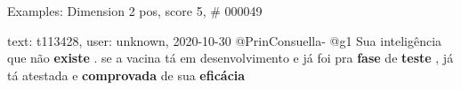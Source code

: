 \begin{frame}{Examples: Dimension 2 pos, score 5, \# 000049}
\footnotesize
\begin{exampleblock}{text: t113428, user: unknown, 2020-10-30}
@PrinConsuella- @g1 Sua inteligência que não \textbf{existe} . se a vacina tá 
em desenvolvimento e já foi pra \textbf{fase} de \textbf{teste} , já tá 
atestada e \textbf{comprovada} de sua \textbf{eficácia} 
\end{exampleblock}
\end{frame}
